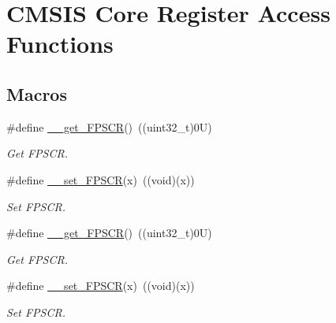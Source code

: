 \hypertarget{group___c_m_s_i_s___core___reg_acc_functions}{}\section{C\+M\+S\+IS Core Register Access Functions}
\label{group___c_m_s_i_s___core___reg_acc_functions}
\subsection*{Macros}
\begin{DoxyCompactItemize}
\item 
\#define \mbox{\hyperlink{group___c_m_s_i_s___core___reg_acc_functions_ga4d0739b1355ca5642a7ce76df1271f01}{\+\_\+\+\_\+get\+\_\+\+F\+P\+S\+CR}}()~((uint32\+\_\+t)0\+U)
\begin{DoxyCompactList}\small\item\em Get F\+P\+S\+CR. \end{DoxyCompactList}\item 
\#define \mbox{\hyperlink{group___c_m_s_i_s___core___reg_acc_functions_ga3cd91c42ad2793c3f3ae553a1b975512}{\+\_\+\+\_\+set\+\_\+\+F\+P\+S\+CR}}(x)~((void)(x))
\begin{DoxyCompactList}\small\item\em Set F\+P\+S\+CR. \end{DoxyCompactList}\item 
\#define \mbox{\hyperlink{group___c_m_s_i_s___core___reg_acc_functions_ga6b3a48e13de4b114653b4e06145a601d}{\+\_\+\+\_\+get\+\_\+\+F\+P\+S\+CR}}()~((uint32\+\_\+t)0\+U)
\begin{DoxyCompactList}\small\item\em Get F\+P\+S\+CR. \end{DoxyCompactList}\item 
\#define \mbox{\hyperlink{group___c_m_s_i_s___core___reg_acc_functions_ga3cd91c42ad2793c3f3ae553a1b975512}{\+\_\+\+\_\+set\+\_\+\+F\+P\+S\+CR}}(x)~((void)(x))
\begin{DoxyCompactList}\small\item\em Set F\+P\+S\+CR. \end{DoxyCompactList}\end{DoxyCompactItemize}
